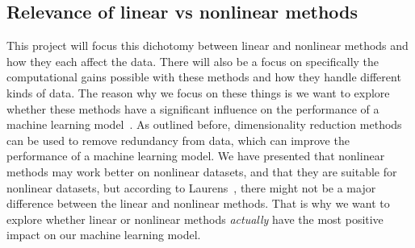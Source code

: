 \subsection{Relevance of linear vs nonlinear methods}
This project will focus this dichotomy between linear and nonlinear methods and how they each affect the data. There will also be a focus on specifically the computational gains possible with these methods and how they handle different kinds of data.
The reason why we focus on these things is we want to explore whether these methods have a significant influence on the performance of a machine learning model~\cite{dimensionality-reduction-reddy,dimensionality-reduction-comparative-review}. As outlined before, dimensionality reduction methods can be used to remove redundancy from data, which can improve the performance of a machine learning model. We have presented that nonlinear methods may work better on nonlinear datasets, and that they are suitable for nonlinear datasets, but according to Laurens~\cite{dimensionality-reduction-comparative-review}, there might not be a major difference between the linear and nonlinear methods. That is why we want to explore whether linear or nonlinear methods \textit{actually} have the most positive impact on our machine learning model.








